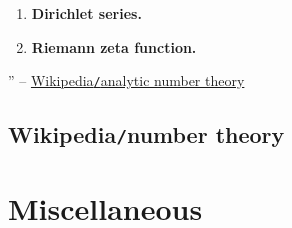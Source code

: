\documentclass{article}
\begin{document}
\begin{enumerate}
	\item {\bf Dirichlet series.}
	\item {\bf Riemann zeta function.}
\end{enumerate}

'' -- \href{https://en.wikipedia.org/wiki/Analytic_number_theory}{Wikipedia{\tt/}analytic number theory}


\subsection{Wikipedia{\tt/}number theory}


\section{Miscellaneous}


\printbibliography[heading=bibintoc]
	
\end{document}
